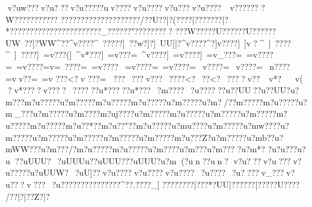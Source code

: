 {{{{{{{{{{{{{{{{{{{{{{{{{{{{{{{{{{{{{{{{{{{{{{{{{{{{{{{{{{{{{{{{{{{{{{{{{{{{{{{{{{{{{{{{{{{{{{{{{{{{{{{{{{{{{{{{{{{{{{{{{{{{{{{{{{{{{{{{{{{{{{{{{{{{{{{{{{{{{{{{{{{{{{{{{{{{{{{{{{{{{{{{{{{{{{{{{{{{{{{{{{{{{{{{{{{{{{{{{{{{{{{{{{{{{{{{{{{{{{{{{{{{{{{{{{{{{{{{{{{{{{{{{{{{{{{{{{{{{{{{{{{{{{{{{{{{{{{{{{{{{{{{{{{{{{{{{{{{{{{{{{{{{{{{{{{{{{{{{{{{{{{{{{{{{{{{{{{{{{{{{{{{{{{{{{{{{{{{{{{{{{{{{{{{{{{{{{{{{{{{{{{{{{{{{{{{{{{{{{{{{{{{{{{{{{{{{{{{{{{{{{{{{{{{{{{{{{{{{{{{{{{{{{{{{{{{{{{{{{{{{{{{{{{{{{{{{{{{{{{{{{{{{{{{{{{{{{{{{{{{{{{{{{{{{{{{{{{{{{{{{{{{{{{{{{{{{{{{{{{{{{{{{{{{{{{{{{{{{{{{{{{{{{{{{{{{{{{{{{{{{{{{{{{{{{{{{{{{{{{{{{{{{{{{{{{{{{{{{{{{{{{{{{{{{{{{{{{{{{{{{{{{{{{{{{{{{{{{{{{{{{{{{{{{{{{{{{{{{{{{{{{{{{{{{{{{{{{{{{{{{{{{{{{{{{{{{{{{{{{{{{{{{{{{{{{{{{{{{{{{{{{{{{{{{{{{{{{{{{{{{{{{{{{{{{{{{{{{{{{{{{{{{{{{{{{{{{{{{{{{{{{{{{{{{{{{{{{{{{{{{{{{{{{{{{{{{{{{{{{{{{{{{{{{{{{{{{{{{{{{{{{{{{{{{{{{{{{{{{{{{{{{{{{{{{{{{{{{{{{{{{{{{{{{{{{{{{{{{{{{{{{{{{{{{{{{{{{{{{{{{{{{{{{{{{{{{{{{{{{{{{{{{{{{{{{{{{{{{{{{{{{{{{{{{{{{{{{{{{{{{{{{{{{{{{{{{{{{{{{{{{{{{{{{{{{{{{{{{{{{{{{{{{{{{{{{{{{{{{{{{{{{{{{{{{{{{{{{{{{{{{{{{{{{{v?uw???v?u???v?u?????uv????v?u????v?u???v?u????~v?????}?
?W??????????}?  ????}???????{?????????/??U??|?(????|???????|? *???????????????????????_??????"?????????
??}?W?? ??}?U?????}?U?????}?UW~?}?]?WW^?}?^v??? }?^~????}?]~??w?]?]~UU}]]?^v????^?]v????]~]v? ^~]~????^~]~????]~=v???(]~^v*???]~=v???=~^v????]~=v????]~=v_???=~=v????=~=v????=v=~????=~=v????~=v????=~=v????=~v????=~v????=~n????=vv??  =~=v
???<?v
???\?=~
???\?~ ???\?v ???\?~????<?~??  <?~??? ?v??~v*?~v (  ?v*????v ????~??????u*?????u*???~?m????~?u??????u??UU??u??UU?u?m???m?u?????u?m?????m?u?????m?u?????u?m?????u?m?/?}?m?????m?u?????u?m_???u?m?????u?m????m?uj????u?m?????m?u?????u?m?????u?m?????m?u?????m?u?????m?u??*??m?u??"??m?u?????u?mu????u?m?????u?mw????u?m?????u?m?????u?m?????u?m?????u?m?????m?u???Z?u?m?????u?m{b??u?mWW???u?m???/?m?u?????m?u?????u?m??? ?u?m?? ?u?m???
?u?m*?
 ?u?u??  ?u?u
  ?}?uUUU?~?uUUUu?}?uUUU??}?uUUU}?u?m (?un  ??un ?
v?u???v?u???v?u?????u?uUUW?~?uU]??v?u????v?u????v?u????~?u????~?u????}v_???v?u???}v???~?u???????? ???????^??.????_]????????|???*?UU|??? ???|?}????U????
/??|?|? ?Z?|?
}}}}}}}}}}}}}}}}}}}}}}}}}}}}}}}}}}}}}}}}}}}}}}}}}}}}}}}}}}}}}}}}}}}}}}}}}}}}}}}}}}}}}}}}}}}}}}}}}}}}}}}}}}}}}}}}}}}}}}}}}}}}}}}}}}}}}}}}}}}}}}}}}}}}}}}}}}}}}}}}}}}}}}}}}}}}}}}}}}}}}}}}}}}}}}}}}}}}}}}}}}}}}}}}}}}}}}}}}}}}}}}}}}}}}}}}}}}}}}}}}}}}}}}}}}}}}}}}}}}}}}}}}}}}}}}}}}}}}}}}}}}}}}}}}}}}}}}}}}}}}}}}}}}}}}}}}}}}}}}}}}}}}}}}}}}}}}}}}}}}}}}}}}}}}}}}}}}}}}}}}}}}}}}}}}}}}}}}}}}}}}}}}}}}}}}}}}}}}}}}}}}}}}}}}}}}}}}}}}}}}}}}}}}}}}}}}}}}}}}}}}}}}}}}}}}}}}}}}}}}}}}}}}}}}}}}}}}}}}}}}}}}}}}}}}}}}}}}}}}}}}}}}}}}}}}}}}}}}}}}}}}}}}}}}}}}}}}}}}}}}}}}}}}}}}}}}}}}}}}}}}}}}}}}}}}}}}}}}}}}}}}}}}}}}}}}}}}}}}}}}}}}}}}}}}}}}}}}}}}}}}}}}}}}}}}}}}}}}}}}}}}}}}}}}}}}}}}}}}}}}}}}}}}}}}}}}}}}}}}}}}}}}}}}}}}}}}}}}}}}}}}}}}}}}}}}}}}}}}}}}}}}}}}}}}}}}}}}}}}}}}}}}}}}}}}}}}}}}}}}}}}}}}}}}}}}}}}}}}}}}}}}}}}}}}}}}}}}}}}}}}}}}}}}}}}}}}}}}}}}}}}}}}}}}}}}}}}}}}}}}}}}}}}}}}}}}}}}}}}}}}}}}}}}}}}}}}}}}}}}}}}}}}}}}}}}}}}}}}}}}}}}}}}}}}}}}}}}}}}}}}}}}}}}}}}}}}}}}}}}}}}}}}}}}}}}}}}}}}}}}}}}}}}}}}}}}}}}}}}}}}}}}}}}}}}}}}}}}}}}}}}}}}}}}}}}}}}}}}}}}}}}}}}}}}}}}}}}}}}}}}}}}}}}}}}}}}}}}}}}}}}}}}}}}}}}}}}}}}}}}}}}}}}}}}}
